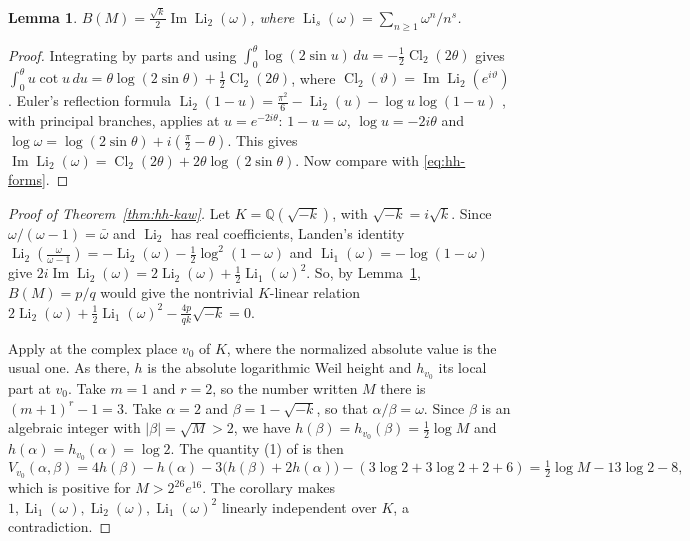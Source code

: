 \documentclass[oneside,english,11pt]{amsart}
\newtheorem{lemma}[thm]{Lemma}
\begin{document}
\begin{lemma}\label{lem:hh-dilog}
$B(M)=\frac{\sqrt k}2\operatorname{Im}\operatorname{Li}_2(\omega)$, where $\operatorname{Li}_s(\omega)=\sum_{n\ge1}\omega^n/n^s$.
\end{lemma}
\begin{proof}
Integrating by parts and using $\int_0^\theta\log(2\sin u)\,du=-\frac12\operatorname{Cl}_2(2\theta)$ gives
$\int_0^\theta u\cot u\,du=\theta\log(2\sin\theta)+\frac12\operatorname{Cl}_2(2\theta)$, where
$\operatorname{Cl}_2(\vartheta)=\operatorname{Im}\operatorname{Li}_2(e^{i\vartheta})$ \cite{lewin1981polylogarithms}. Euler's reflection formula
$\operatorname{Li}_2(1-u)=\frac{\pi^2}6-\operatorname{Li}_2(u)-\log u\log(1-u)$ \cite{lewin1981polylogarithms}, with principal branches,
applies at $u=e^{-2i\theta}$: $1-u=\omega$, $\log u=-2i\theta$ and $\log\omega=\log(2\sin\theta)+i(\frac\pi2-\theta)$. This gives
$\operatorname{Im}\operatorname{Li}_2(\omega)=\operatorname{Cl}_2(2\theta)+2\theta\log(2\sin\theta)$. Now compare with \eqref{eq:hh-forms}.
\end{proof}

\begin{proof}[Proof of Theorem~\ref{thm:hh-kaw}]
Let $K=\mathbb Q(\sqrt{-k})$, with $\sqrt{-k}=i\sqrt k$. Since $\omega/(\omega-1)=\bar \omega$ and $\operatorname{Li}_2$ has real coefficients, Landen's
identity $\operatorname{Li}_2(\frac \omega{\omega-1})=-\operatorname{Li}_2(\omega)-\frac12\log^2(1-\omega)$ \cite{lewin1981polylogarithms} and
$\operatorname{Li}_1(\omega)=-\log(1-\omega)$ give $2i\operatorname{Im}\operatorname{Li}_2(\omega)=2\operatorname{Li}_2(\omega)+\frac12\operatorname{Li}_1(\omega)^2$.
So, by Lemma~\ref{lem:hh-dilog}, $B(M)=p/q$ would give the nontrivial $K$-linear relation
$2\operatorname{Li}_2(\omega)+\frac12\operatorname{Li}_1(\omega)^2-\frac{4p}{qk}\sqrt{-k}=0$.

Apply \cite[Corollary~2.3]{kawashima2026linear} at the complex place $v_0$ of $K$, where the normalized absolute value is the usual
one. As there, $h$ is the absolute logarithmic Weil height and $h_{v_0}$ its local part at $v_0$. Take $m=1$ and $r=2$, so the number written $M$ there is $(m+1)^r-1=3$. Take $\alpha=2$ and $\beta=1-\sqrt{-k}$, so that
$\alpha/\beta=\omega$. Since $\beta$ is an algebraic integer with $|\beta|=\sqrt M>2$, we have $h(\beta)=h_{v_0}(\beta)=\frac12\log M$ and
$h(\alpha)=h_{v_0}(\alpha)=\log2$. The quantity (1) of \cite{kawashima2026linear} is then
\[
 V_{v_0}(\alpha,\beta)=4h(\beta)-h(\alpha)-3\bigl(h(\beta)+2h(\alpha)\bigr)-(3\log2+3\log2+2+6)=\tfrac12\log M-13\log2-8 ,
\]
which is positive for $M>2^{26}e^{16}$. The corollary makes $1,\operatorname{Li}_1(\omega),\operatorname{Li}_2(\omega),\operatorname{Li}_1(\omega)^2$
linearly independent over $K$, a contradiction.
\end{proof}
\end{document}
